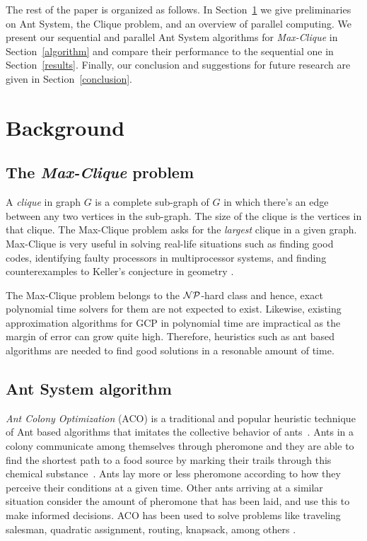 \documentclass[11pt]{article}
\begin{document}
The rest of the paper is organized as follows. In Section~\ref{background} we give preliminaries on Ant System, the Clique problem, and an overview of parallel computing.  We present our sequential and parallel Ant System algorithms for \textit{Max-Clique} in Section~\ref{algorithm} and compare their performance to the sequential one in Section~\ref{results}.  Finally, our conclusion and suggestions for future research are given in Section~\ref{conclusion}.


\section{Background}\label{background} 
\subsection{The \textit{Max-Clique} problem}

A \textit{clique} in graph $G$ is a complete sub-graph of $G$ in which there's an edge between any two vertices in the sub-graph.  The size of the clique is the vertices in that clique. The  Max-Clique problem asks for the \textit{largest} clique in a given graph.  Max-Clique is very useful in solving real-life situations such as finding good codes, identifying faulty processors in multiprocessor systems, and finding counterexamples to Keller's conjecture in geometry \cite{BP2}\cite{Sloane}\cite{SMW}\cite{Keller}\cite{LS}. 

The Max-Clique problem belongs to the $\cal NP$-hard class and hence, exact polynomial time solvers for them are not expected to exist. Likewise, existing approximation algorithms for GCP in polynomial time are impractical as the margin of error can grow quite high. Therefore, heuristics such as ant based algorithms are needed to find good solutions in a resonable amount of time.


\subsection{Ant System algorithm}\label{max_clique} 


\textit{Ant Colony Optimization} (ACO) is a traditional and popular heuristic technique of Ant based algorithms that imitates the collective behavior of ants~\cite{DD}. Ants in a colony communicate among themselves through pheromone and they are able to find the shortest path to a food source by marking their trails through this chemical substance~\cite{BDT, DG}. Ants lay more or less pheromone according to how they perceive their conditions at a given time. Other ants arriving at a similar situation consider the amount of pheromone that has been laid, and use this to make informed decisions. ACO has been used to solve problems like traveling salesman, quadratic assignment, routing, knapsack, among others \cite{DG, BJ2, MC}.
\end{document}
